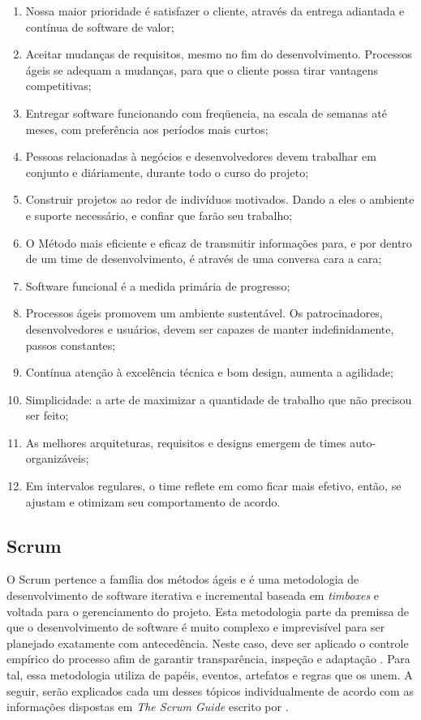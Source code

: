 \begin{enumerate}
    \item Nossa maior prioridade é satisfazer o cliente, através da entrega adiantada
    e contínua de software de valor;
    \item Aceitar mudanças de requisitos, mesmo no fim do desenvolvimento. Processos
    ágeis se adequam a mudanças, para que o cliente possa tirar vantagens competitivas;
    \item Entregar software funcionando com freqüencia, na escala de semanas até meses,
    com preferência aos períodos mais curtos;
    \item Pessoas relacionadas à negócios e desenvolvedores devem trabalhar em conjunto
    e diáriamente, durante todo o curso do projeto;
    \item Construir projetos ao redor de indivíduos motivados. Dando a eles o ambiente e
    suporte necessário, e confiar que farão seu trabalho;
    \item O Método mais eficiente e eficaz de transmitir informações para, e por dentro
    de um time de desenvolvimento, é através de uma conversa cara a cara;
    \item Software funcional é a medida primária de progresso;
    \item Processos ágeis promovem um ambiente sustentável. Os patrocinadores,
    desenvolvedores e usuários, devem ser capazes de manter indefinidamente, passos
    constantes;
    \item Contínua atenção à excelência técnica e bom design, aumenta a agilidade;
    \item Simplicidade: a arte de maximizar a quantidade de trabalho que não precisou ser
    feito;
    \item As melhores arquiteturas, requisitos e designs emergem de times auto-organizáveis;
    \item Em intervalos regulares, o time reflete em como ficar mais efetivo, então, se
    ajustam e otimizam seu comportamento de acordo.
\end{enumerate}

\subsection{Scrum}

O Scrum pertence a família dos métodos ágeis e é uma metodologia de desenvolvimento
de software iterativa e incremental baseada em \textit{timboxes} e voltada para o
gerenciamento do projeto. Esta metodologia parte da premissa de que o desenvolvimento
de software é muito complexo e imprevisível para ser planejado exatamente com
antecedência. Neste caso, deve ser aplicado o controle empírico do processo afim de
garantir transparência, inspeção e adaptação \cite{Mahnic2005}. Para tal, essa
metodologia utiliza de papéis, eventos, artefatos e regras que os unem. A seguir,
serão explicados cada um desses tópicos individualmente de acordo com as informações
dispostas em \textit{The Scrum Guide} escrito por .

